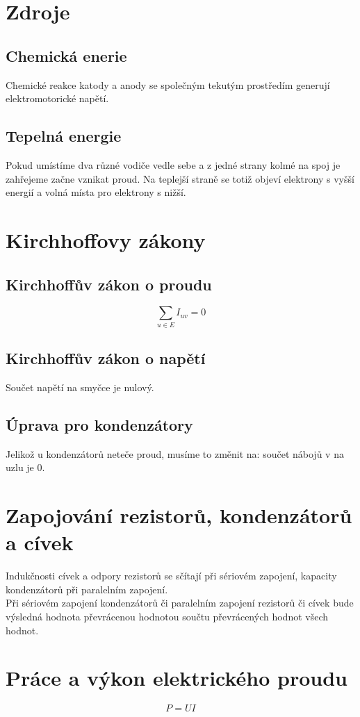 \documentclass[titlepage]{book}
\begin{document}
\section{Zdroje}
\subsection{Chemická enerie}
Chemické reakce katody a anody se společným tekutým prostředím generují elektromotorické napětí.
\subsection{Tepelná energie}
Pokud umístíme dva různé vodiče vedle sebe a z jedné strany kolmé na spoj je zahřejeme začne vznikat proud. Na teplejší straně se totiž objeví elektrony s vyšší energií a volná místa pro elektrony s nižší.
\section{Kirchhoffovy zákony}
\subsection{Kirchhoffův zákon o proudu}
\begin{equation}\label{eq:random}
\sum_{u \in E} I_{uv} = 0
\end{equation}
\subsection{Kirchhoffův zákon o napětí}
Součet napětí na smyčce je nulový.
\subsection{Úprava pro kondenzátory}
Jelikož u kondenzátorů neteče proud, musíme to změnit na: součet nábojů v na uzlu je 0.
\section{Zapojování rezistorů, kondenzátorů a cívek}
Indukčnosti cívek a odpory rezistorů se sčítají při sériovém zapojení, kapacity kondenzátorů při paralelním zapojení.\\
Při sériovém zapojení kondenzátorů či paralelním zapojení rezistorů či cívek bude výsledná hodnota převrácenou hodnotou součtu převrácených hodnot všech hodnot.
\section{Práce a výkon elektrického proudu}
\begin{equation}
P = UI
\end{equation}
\end{document}
